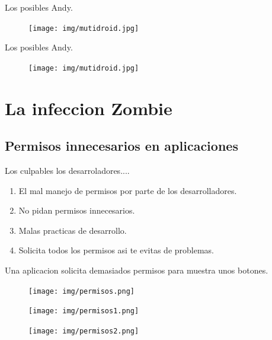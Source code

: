 \documentclass[12pt]{beamer} %
\begin{document}
\begin{slide}

     Los posibles Andy.
  \begin{figure}[h]
      \texttt{[image: img/mutidroid.jpg]}
    \end{figure}
\end{slide}

\begin{slide}

     Los posibles Andy.
  \begin{figure}[h]
      \texttt{[image: img/mutidroid.jpg]}
    \end{figure}
\end{slide}

\section{La infeccion Zombie}
\subsection{Permisos innecesarios en aplicaciones}
\begin{slide}
 Los culpables los desarroladores....
  \begin{enumerate}
    \item El mal manejo de permisos por parte de los desarrolladores.\pause
    \item No pidan permisos innecesarios.\pause
    \item Malas practicas de desarrollo.\pause
    \item Solicita todos los permisos asi te evitas de problemas.
  \end{enumerate}
\end{slide}

\begin{slide}
  Una aplicacion solicita demasiados permisos para muestra unos botones.
    \begin{figure}[h]
      \texttt{[image: img/permisos.png]}
    \end{figure}
\end{slide}

\begin{slide}
    \begin{figure}[h]
      \texttt{[image: img/permisos1.png]}
    \end{figure}
\end{slide}

\begin{slide}
    \begin{figure}[h]
      \texttt{[image: img/permisos2.png]}
    \end{figure}
\end{slide}
\end{document}
